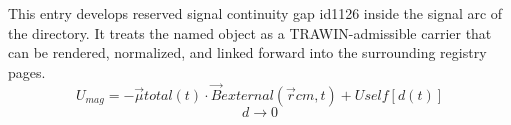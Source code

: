 
\begin{tzpsnapshot}
\end{tzpsnapshot}

This entry develops reserved signal continuity gap id1126 inside the signal arc of the directory. It treats the named object as a TRAWIN-admissible carrier that can be rendered, normalized, and linked forward into the surrounding registry pages.
\[
U_{mag} = -\vec{\mu} {total}(t) \cdot \vec{B} {external}(\vec{r} {cm}, t) + U {self}[d(t)]
\]
\[
d \to 0
\]

